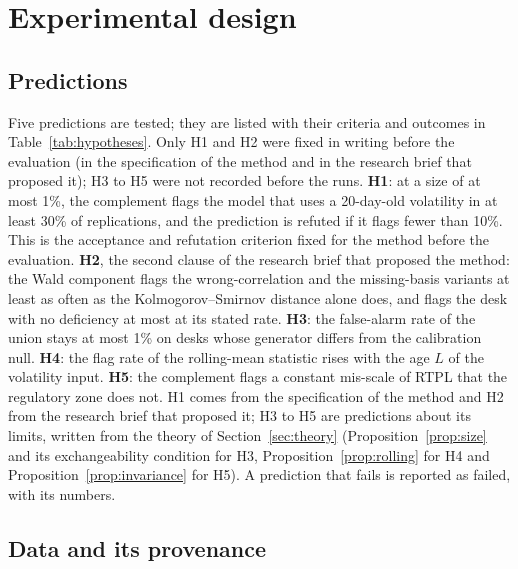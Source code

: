 \section{Experimental design}
\label{sec:experimental-design}

\subsection{Predictions}
\label{sec:design-hypotheses}

Five predictions are tested; they are listed with their criteria and outcomes in Table~\ref{tab:hypotheses}.
Only H1 and H2 were fixed in writing before the evaluation (in the specification of the method and in the research brief that proposed it); H3 to H5 were not recorded before the runs.
\textbf{H1}: at a size of at most 1\%, the complement flags the model that uses a 20-day-old volatility in at least 30\% of replications, and the prediction is refuted if it flags fewer than 10\%.
This is the acceptance and refutation criterion fixed for the method before the evaluation.
\textbf{H2}, the second clause of the research brief that proposed the method: the Wald component flags the wrong-correlation and the missing-basis variants at least as often as the Kolmogorov--Smirnov distance alone does, and flags the desk with no deficiency at most at its stated rate.
\textbf{H3}: the false-alarm rate of the union stays at most 1\% on desks whose generator differs from the calibration null.
\textbf{H4}: the flag rate of the rolling-mean statistic rises with the age $L$ of the volatility input.
\textbf{H5}: the complement flags a constant mis-scale of RTPL that the regulatory zone does not.
H1 comes from the specification of the method and H2 from the research brief that proposed it; H3 to H5 are predictions about its limits, written from the theory of Section~\ref{sec:theory} (Proposition~\ref{prop:size} and its exchangeability condition for H3, Proposition~\ref{prop:rolling} for H4 and Proposition~\ref{prop:invariance} for H5).
A prediction that fails is reported as failed, with its numbers.

\subsection{Data and its provenance}
\label{sec:design-data}

